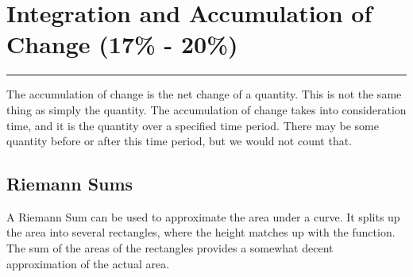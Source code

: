 \documentclass[12pt]{article}
\begin{document}
    \section{Integration and Accumulation of Change (17\% - 20\%)}
    \par\noindent\rule{\textwidth}{0.1pt}

        The accumulation of change is the net change of a quantity. This is not the same thing as simply the quantity. The accumulation of change takes into consideration time, and it is the quantity over a specified time period. There may be some quantity before or after this time period, but we would not count that.

        \subsection{Riemann Sums}
            A Riemann Sum can be used to approximate the area under a curve. It splits up the area into several rectangles, where the height matches up with the function. The sum of the areas of the rectangles provides a somewhat decent approximation of the actual area.
\end{document}
